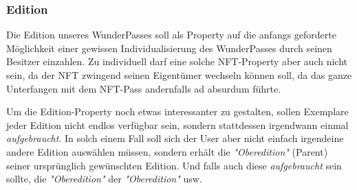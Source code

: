 
\subsubsection{Edition}

\vspace{0.3cm}

Die Edition unseres WunderPasses soll als Property auf die anfangs geforderte Möglichkeit einer gewissen Individualisierung des WunderPasses durch seinen Besitzer einzahlen. Zu individuell darf eine solche NFT-Property aber auch nicht sein, da der NFT zwingend seinen Eigentümer wechseln können soll, da das ganze Unterfangen mit dem NFT-Pass andernfalls ad absurdum führte.

Um die Edition-Property noch etwas interessanter zu gestalten, sollen Exemplare jeder Edition nicht endlos verfügbar sein, sondern stattdessen irgendwann einmal \textit{aufgebraucht}. In solch einem Fall soll sich der User aber nicht einfach irgendeine andere Edition auswählen müssen, sondern erhält die \textit{"Oberedition"} (Parent) seiner ursprünglich gewünschten Edition. Und falls auch diese \textit{aufgebraucht} sein sollte, die \textit{"Oberedition"} der \textit{"Oberedition"} usw. 

\vspace{0.2cm}


